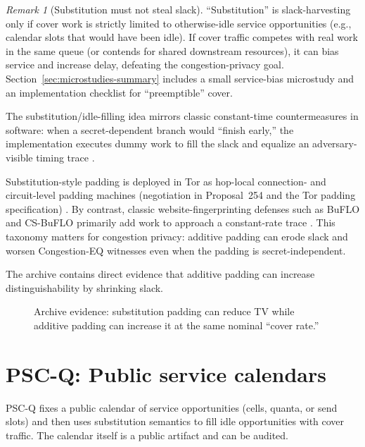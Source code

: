 \documentclass[11pt]{article}
\theoremstyle{definition}
\theoremstyle{remark}
\newtheorem{remark}{Remark}
\begin{document}
\begin{remark}[Substitution must not steal slack]
``Substitution'' is slack-harvesting only if cover work is strictly limited to otherwise-idle service opportunities (e.g., calendar slots that would have been idle).
If cover traffic competes with real work in the same queue (or contends for shared downstream resources), it can bias service and increase delay, defeating the congestion-privacy goal.
Section~\ref{sec:microstudies-summary} includes a small service-bias microstudy and an implementation checklist for ``preemptible'' cover.
\end{remark}

The substitution/idle-filling idea mirrors classic constant-time countermeasures in software: when a secret-dependent branch would ``finish early,'' the implementation executes dummy work to fill the slack and equalize an adversary-visible timing trace \cite{agat2000,mishra_fallthrough2025}.

Substitution-style padding is deployed in Tor as hop-local connection- and circuit-level padding machines (negotiation in Proposal~254 and the Tor padding specification) \cite{torproposal254,torpaddingspec}.
By contrast, classic website-fingerprinting defenses such as BuFLO and CS-BuFLO primarily add work to approach a constant-rate trace \cite{dyer2012peekaboo,csbuflo}.
This taxonomy matters for congestion privacy: additive padding can erode slack and worsen Congestion-EQ witnesses even when the padding is secret-independent.

The archive contains direct evidence that additive padding can increase distinguishability by shrinking slack.

\begin{figure}[t]
\centering
{}
\caption{Archive evidence: substitution padding can reduce TV while additive padding can increase it at the same nominal ``cover rate.''}
\label{fig:tax}
\end{figure}

\section{PSC-Q: Public service calendars}
PSC-Q fixes a public calendar of service opportunities (cells, quanta, or send slots) and then uses substitution semantics to fill idle opportunities with cover traffic.
The calendar itself is a public artifact and can be audited.
\end{document}

